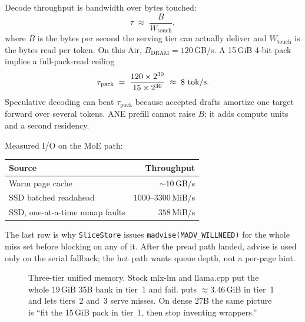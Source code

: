 Decode throughput is bandwidth over bytes touched:
\begin{equation}
\label{eq:bw}
  \tau \;\approx\; \frac{B}{W_{\mathrm{touch}}},
\end{equation}
where $B$ is the bytes per second the serving tier can actually deliver and $W_{\mathrm{touch}}$ is the bytes read per token. On this Air, $B_{\mathrm{DRAM}} = 120$\,GB/s. A 15\,GiB 4-bit pack implies a full-pack-read ceiling
\begin{equation}
  \tau_{\mathrm{pack}} \;=\; \frac{120\times 2^{30}}{15\times 2^{30}} \;\approx\; 8\ \mathrm{tok/s}.
\end{equation}
Speculative decoding can beat $\tau_{\mathrm{pack}}$ because accepted drafts amortize one target forward over several tokens. ANE prefill cannot raise $B$; it adds compute units and a second residency.

Measured I/O on the MoE path:
\begin{center}
\begin{tabular}{@{}lr@{}}
\toprule
Source & Throughput \\
\midrule
Warm page cache & $\sim 10$\,GB/s \\
SSD batched readahead & $1000$--$3300$\,MiB/s \\
SSD, one-at-a-time mmap faults & $358$\,MiB/s \\
\bottomrule
\end{tabular}
\end{center}
The last row is why \texttt{SliceStore} issues \texttt{madvise(MADV\_WILLNEED)} for the whole miss set before blocking on any of it. After the pread path landed, advise is used only on the serial fallback; the hot path wants queue depth, not a per-page hint.

\begin{figure}[t]
\centering
{}
\caption{Three-tier unified memory. Stock mlx-lm and llama.cpp put the whole 19\,GiB 35B bank in tier~1 and fail. \slotbank{} puts $\approx 3.46$\,GiB in tier~1 and lets tiers~2 and~3 serve misses. On dense 27B the same picture is ``fit the 15\,GiB pack in tier~1, then stop inventing wrappers.''}
\label{fig:tiers}
\end{figure}

